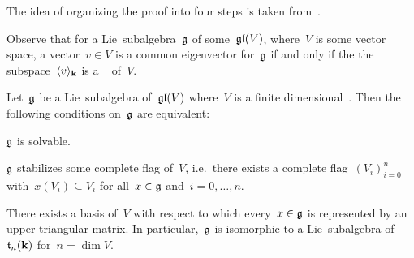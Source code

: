 \begin{remark}
 The idea of organizing the proof into four steps is taken from~\cite[\S 4.1]{Humphreys}.
\end{remark}


\begin{remark}
  Observe that for a Lie~subalgebra~$\glie$ of some~$\mathfrak{gl}(V)$, where~$V$ is some vector space, a vector~$v \in V$ is a common eigenvector for~$\glie$ if and only if the the subspace~$\langle v\rangle_{\mathbf{k}}$ is a {\onedimensional}~{\subrepresentation{$\glie$}} of~$V$.
\end{remark}


\begin{proposition}
  \label{triangularization of solvable linear lie algebras}
  Let~$\glie$ be a Lie~subalgebra of~$\mathfrak{gl}(V)$ where~$V$ is a finite dimensional~{\vectorspace{$\kf$}}.
  Then the following conditions on~$\glie$ are equivalent:
  \begin{equivalenceslist}
    \item
      \label{is solvable}
      $\glie$ is solvable.
    \item
      \label{stabilizes a complete flag}
      $\glie$ stabilizes some complete flag of~$V$, i.e.\ there exists a complete flag~$(V_i)_{i=0}^n$ with~$x(V_i) \subseteq V_i$ for all~$x \in \mathfrak{g}$ and~$i = 0, \dotsc, n$.
    \item
      \label{is triangularizable}
      There exists a basis of~$V$ with respect to which every~$x \in \mathfrak{g}$ is represented by an upper triangular matrix.
      In particular,~$\glie$ is isomorphic to a Lie~subalgebra of~$\mathfrak{t}_n(\mathbf{k})$ for~$n = \dim V$.
  \end{equivalenceslist}
\end{proposition}


